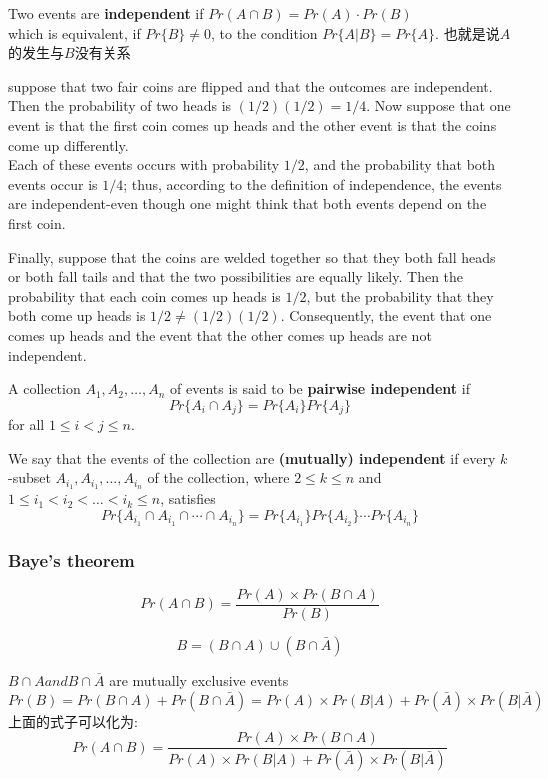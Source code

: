 \documentclass{article}
\begin{document}
\bigskip
Two events are \textbf{independent} if $Pr(A \cap B) = Pr(A)\cdot Pr(B)$ \\
which is equivalent, if $Pr\{B\} \neq 0$, to the condition $Pr\{A | B\} = Pr\{A\}$.
也就是说$A$的发生与$B$没有关系

\begin{example}
suppose that two fair coins are flipped and that the outcomes are independent. Then the probability of two heads is $(1/2)(1/2) = 1/4$.
Now suppose that one event is that the first coin comes up heads and the other event is that the coins come up differently.\\
Each of these events occurs with probability $1/2$, and the probability that both events occur is $1/4$;
thus, according to the definition of independence, the events are independent-even though one might think that both events depend on the first coin.

Finally, suppose that the coins are welded together so that they both fall heads or both fall tails and that the two possibilities are equally likely.
Then the probability that each coin comes up heads is $1/2$, but the probability that they both come up heads is $1/2 \neq (1/2)(1/2)$.
Consequently, the event that one comes up heads and the event that the other comes up heads are not independent.
\end{example}

A collection $A_1, A_2,\ldots, A_n$ of events is said to be \textbf{pairwise independent} if
$$Pr\{A_i \cap A_j\} = Pr\{A_i\}Pr\{A_j\}$$
for all $1 \leq i < j \leq n$.

We say that the events of the collection are \textbf{(mutually) independent}
if every $k$-subset $A_{i_1},A_{i_1},\ldots,A_{i_n}$ of the collection, where $2 \leq k \leq n$ and $1 \leq i_1< i_2< \ldots < i_k \leq n$, satisfies
$$ Pr\{A_{i_1} \cap A_{i_1} \cap \cdots \cap A_{i_n}\} = Pr\{A_{i_1}\} Pr\{A_{i_2}\} \cdots Pr\{A_{i_n}\} $$

\subsubsection{Baye's theorem}
$$ Pr(A\cap B)=\frac{Pr(A) \times Pr(B \cap A)}{Pr(B)} $$

$$ B=(B \cap A)\cup (B \cap \bar{A}) $$

\noindent
$B \cap A and B \cap \overline{A}$ are mutually exclusive events
$$ Pr(B)=Pr(B \cap A)+Pr(B \cap \bar{A}) =Pr(A) \times Pr(B|A)+Pr(\bar{A}) \times Pr(B|\bar{A}) $$
上面的式子可以化为:
$$ Pr(A\cap B)=\frac{Pr(A) \times Pr(B \cap A)}{Pr(A) \times Pr(B|A)+Pr(\bar{A}) \times Pr(B|\bar{A})} $$
\end{document}

